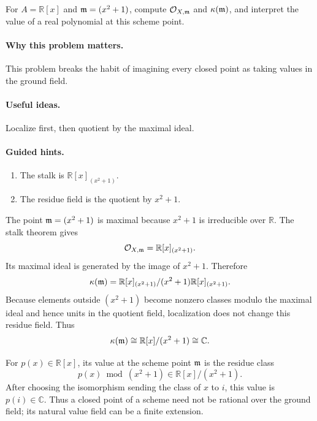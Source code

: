 \begin{problem}\label{prob:vi17-p15}
For $A=\mathbb R[x]$ and $\mathfrak m=(x^2+1)$, compute $\mathcal O_{X,\mathfrak m}$ and $\kappa(\mathfrak m)$, and interpret the value of a real polynomial at this scheme point.
\end{problem}

\ifdefined\FullProblemDossiers
\paragraph{Why this problem matters.}
This problem breaks the habit of imagining every closed point as taking values in the ground field.

\paragraph{Useful ideas.}
Localize first, then quotient by the maximal ideal.

\paragraph{Guided hints.}
\begin{enumerate}
\item The stalk is $\mathbb R[x]_{(x^2+1)}$.
\item The residue field is the quotient by $x^2+1$.
\end{enumerate}

\begin{solution}
The point $\mathfrak m=(x^2+1)$ is maximal because $x^2+1$ is irreducible over $\mathbb R$.  The stalk theorem gives
\[
\mathcal O_{X,\mathfrak m}=\mathbb R[x]_{(x^2+1)}.
\]
Its maximal ideal is generated by the image of $x^2+1$.  Therefore
\[
\kappa(\mathfrak m)
=
\mathbb R[x]_{(x^2+1)}/(x^2+1)\mathbb R[x]_{(x^2+1)}.
\]
Because elements outside $(x^2+1)$ become nonzero classes modulo the maximal ideal and hence units in the quotient field, localization does not change this residue field.  Thus
\[
\kappa(\mathfrak m)\cong\mathbb R[x]/(x^2+1)\cong\mathbb C.
\]

For $p(x)\in\mathbb R[x]$, its value at the scheme point $\mathfrak m$ is the residue class
\[
p(x)\bmod(x^2+1)\in\mathbb R[x]/(x^2+1).
\]
After choosing the isomorphism sending the class of $x$ to $i$, this value is $p(i)\in\mathbb C$.  Thus a closed point of a scheme need not be rational over the ground field; its natural value field can be a finite extension.
\end{solution}



